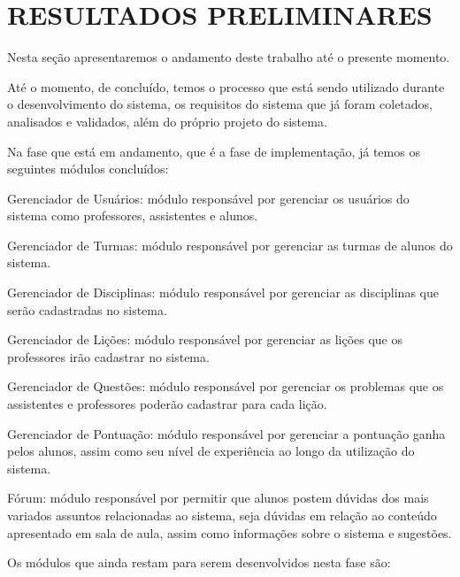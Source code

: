 \section{RESULTADOS PRELIMINARES}

Nesta seção apresentaremos o andamento deste trabalho até o presente momento.

Até o momento, de concluído, temos o processo que está sendo utilizado durante o desenvolvimento do sistema, os requisitos do sistema que já foram coletados, analisados e validados, além do próprio projeto do sistema. 

Na fase que está em andamento, que é a fase de implementação, já temos os seguintes módulos concluídos: 

\begin{alineascomponto}
	\item Gerenciador de Usuários: módulo responsável por gerenciar os usuários do sistema como professores, assistentes e alunos.
	\item Gerenciador de Turmas: módulo responsável por gerenciar as turmas de alunos do sistema.
    \item Gerenciador de Disciplinas: módulo responsável por gerenciar as disciplinas que serão cadastradas no sistema.
    \item Gerenciador de Lições: módulo responsável por gerenciar as lições que os professores irão cadastrar no sistema.
    \item Gerenciador de Questões: módulo responsável por gerenciar os problemas que os assistentes e professores poderão cadastrar para cada lição.
    \item Gerenciador de Pontuação: módulo responsável por gerenciar a pontuação ganha pelos alunos, assim como seu nível de experiência ao longo da utilização do sistema. 
    \item Fórum: módulo responsável por permitir que alunos postem dúvidas dos mais variados  assuntos relacionadas ao sistema, seja dúvidas em relação ao conteúdo apresentado em sala de aula, assim como informações sobre o sistema e sugestões. 
\end{alineascomponto}

Os módulos que ainda restam para serem desenvolvidos nesta fase são:

